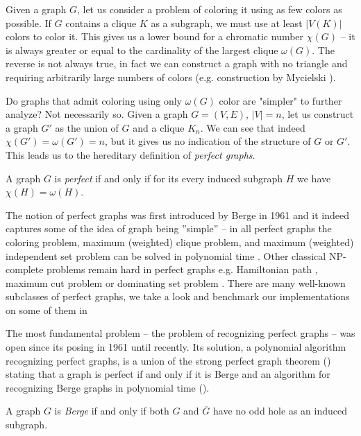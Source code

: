Given a graph $G$, let us consider a problem of coloring it using as few colors as possible. If $G$ contains a clique $K$ as a subgraph, we must use at least $|V(K)|$ colors to color it. This gives us a lower bound for a chromatic number $\chi(G)$ -- it is always greater or equal to the cardinality of the largest clique $\omega(G)$. The reverse is not always true, in fact we can construct a graph with no triangle and requiring arbitrarily large numbers of colors (e.g. construction by Mycielski \cite{Mycielski1955}).

Do graphs that admit coloring using only $\omega(G)$ color are "simpler" to further analyze? Not necessarily so. Given a graph $G = (V, E)$, $|V| = n$, let us construct a graph $G'$ as the union of $G$ and a clique $K_n$. We can see that indeed $\chi(G') = \omega(G') = n$, but it gives us no indication of the structure of $G$ or $G'$. This leads us to the hereditary definition of \emph{perfect graphs}.

\begin{defn}
	\label{def:perfectGraph}
	A graph $G$ is \emph{perfect} if and only if for its every induced subgraph $H$ we have $\chi(H) = \omega(H)$.
\end{defn}

The notion of perfect graphs was first introduced by Berge in 1961 \cite{CB61} and it indeed captures some of the idea of graph being ''simple'' -- in all perfect graphs the coloring problem, maximum (weighted) clique problem, and maximum (weighted) independent set problem can be solved in polynomial time \cite{grotschel1993}. Other classical NP-complete problems remain hard in perfect graphs e.g. Hamiltonian path \cite{Mller1996}, maximum cut problem \cite{Bodlaender1994} or dominating set problem \cite{Dewdney81}. There are many well-known subclasses of perfect graphs, we take a look and benchmark our implementations on some of them in 

The most fundamental problem -- the problem of recognizing perfect graphs -- was open since its posing in 1961 until recently. Its solution, a polynomial algorithm recognizing perfect graphs, is a union of the strong perfect graph theorem () stating that a graph is perfect if and only if it is Berge and an algorithm for recognizing Berge graphs in polynomial time ().

\begin{defn}
	\label{def:bergeGraph}
	A graph $G$ is \emph{Berge} if and only if both $G$ and $\overline{G}$ have no odd hole as an induced subgraph.
\end{defn}

